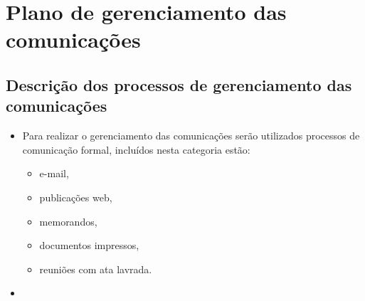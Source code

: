 
\chapter{Plano de gerenciamento das comunicações}
\label{ch:communication-management-plan}


\section{Descrição dos processos de gerenciamento das comunicações}

\begin{itemize}
\item Para realizar o gerenciamento das comunicações serão utilizados processos de comunicação formal, incluídos nesta categoria estão:
\begin{itemize}
\item e-mail,
\item publicações web,
\item memorandos,
\item documentos impressos,
\item reuniões com ata lavrada.
\end{itemize}
\item 
\end{itemize}